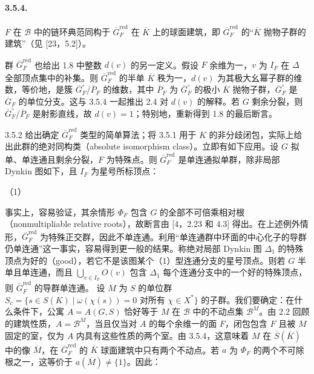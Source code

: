 \paragraph*{3.5.4.}$F$ 在 $\mathscr B$ 中的链环典范同构于 $\overline G_F^{\mathrm{red}}$ 在 $\overline K$ 上的球面建筑，即 $\overline G_F^{\mathrm{red}}$ 的“$\overline K$ 抛物子群的建筑”（见 [23，5.2]）。

群 $\overline G_F^{\mathrm{red}}$ 也给出 1.8 中整数 $d(v)$ 的另一定义。假设 $F$ 余维为一，$v$ 为 $I_F$ 在 $\Delta$ 全部顶点集中的补集。则 $\overline G_F^{\mathrm{red}}$ 的半单 $\overline K$ 秩为一，$d(v)$ 为其极大幺幂子群的维数，等价地，是簇 $\overline G_F^\circ/\overline P_F$ 的维数，其中 $\overline P_F$ 为 $\overline G_F^\circ$ 的极小 $\overline K$ 抛物子群，$\overline G_F^\circ$ 是 $\overline G_F$ 的单位分支。这与 3.5.4 一起推出 2.4 对 $d(v)$ 的解释。若 $G$ 剩余分裂，则 $\overline G_F^\circ/\overline P_F$ 是射影直线，故 $d(v)=1$；特别地，重新得到 1.8 的最后断言。

3.5.2 给出确定 $\overline G_F^{\mathrm{red}}$ 类型的简单算法；将 3.5.1 用于 $K$ 的非分歧闭包，实际上给出此群的绝对同构类（absolute isomorphism class）。立即有如下应用。设 $G$ 拟单、单连通且剩余分裂，$F$ 为特殊点。则 $\overline G_F^{\mathrm{red}}$ 是单连通拟单群，除非局部 Dynkin 图如下，且 $I_F$ 为星号所标顶点：
\begin{center}
\qquad（1）
\end{center}
事实上，容易验证，其余情形 $\Phi_F$ 包含 $G$ 的全部不可倍乘相对根（nonmultipliable relative roots），故断言由 [4，2.23 和 4.3] 得出。在上述例外情形，$\overline G_F^{\mathrm{red}}$ 为特殊正交群，因此不单连通。利用“单连通群中环面的中心化子的导群仍单连通”这一事实，容易得到更一般的结果。称绝对局部 Dynkin 图 $\Delta_1$ 的特殊顶点为好的（good），若它不是该图某个（1）型连通分支的星号顶点。则若 $G$ 半单且单连通，而且 $\bigcup_{v\in I_F}O(v)$ 包含 $\Delta_1$ 每个连通分支中的一个好的特殊顶点，则 $\overline G_F^{\mathrm{red}}$ 的导群单连通。
设 $M$ 为 $S$ 的单位群 $S_c=\{s\in S(K)\mid\omega(\chi(s))=0\text{ 对所有 }\chi\in X^*\}$ 的子群。我们要确定：在什么条件下，公寓 $A=A(G,S)$ 恰好等于 $M$ 在 $\mathscr B$ 中的不动点集 $\mathscr B^M$。由 2.2 回顾的建筑性质，$A=\mathscr B^M$，当且仅当对 $A$ 的每个余维一的面 $F$，闭包包含 $F$ 且被 $M$ 固定的室，仅为 $A$ 内具有这些性质的两个室。由 3.5.4，这意味着 $M$ 在 $\overline S(\overline K)$ 中的像 $\overline M$，在 $\overline G_F^{\mathrm{red}}$ 的 $\overline K$ 球面建筑中只有两个不动点。若 $a$ 为 $\Phi_F$ 的两个不可除根之一，这等价于 $a(\overline M)\ne\{1\}$。因此：

